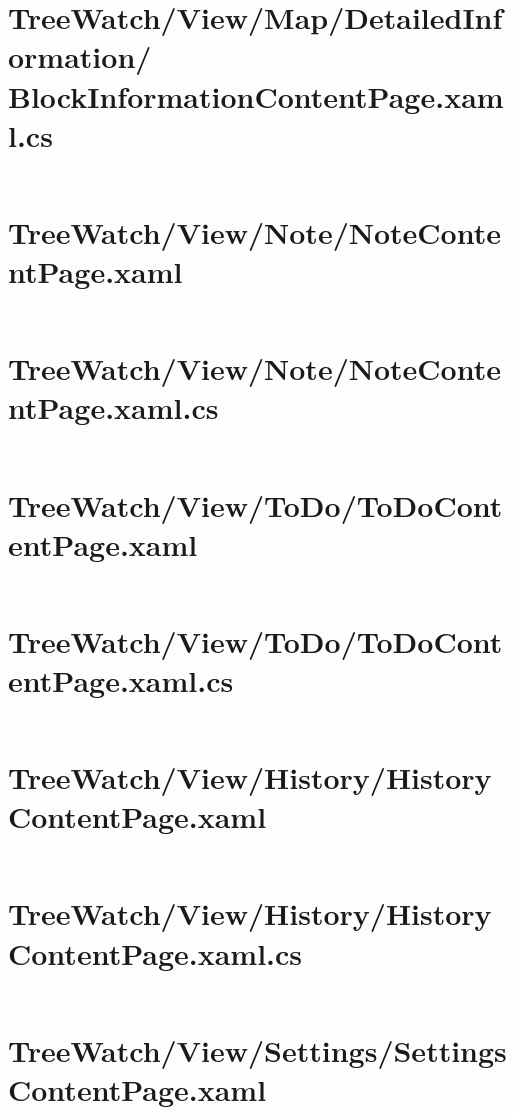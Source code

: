 \documentclass[12pt]{article}
\begin{document}
\pagebreak\section{TreeWatch/View/Map/DetailedInformation/ BlockInformationContentPage.xaml.cs}
\inputminted[linenos,firstline=22]{csharp}{../../../src/TreeWatch/View/Map/DetailedInformation/BlockInformationContentPage.xaml.cs}

\pagebreak\section{TreeWatch/View/Note/NoteContentPage.xaml}
\inputminted[linenos]{xml}{../../../src/TreeWatch/View/Note/NoteContentPage.xaml}

\pagebreak\section{TreeWatch/View/Note/NoteContentPage.xaml.cs}
\inputminted[linenos,firstline=22]{csharp}{../../../src/TreeWatch/View/Note/NoteContentPage.xaml.cs}

\pagebreak\section{TreeWatch/View/ToDo/ToDoContentPage.xaml}
\inputminted[linenos]{xml}{../../../src/TreeWatch/View/ToDo/ToDoContentPage.xaml}

\pagebreak\section{TreeWatch/View/ToDo/ToDoContentPage.xaml.cs}
\inputminted[linenos,firstline=22]{csharp}{../../../src/TreeWatch/View/ToDo/ToDoContentPage.xaml.cs}

\pagebreak\section{TreeWatch/View/History/HistoryContentPage.xaml}
\inputminted[linenos]{xml}{../../../src/TreeWatch/View/History/HistoryContentPage.xaml}

\pagebreak\section{TreeWatch/View/History/HistoryContentPage.xaml.cs}
\inputminted[linenos,firstline=22]{csharp}{../../../src/TreeWatch/View/History/HistoryContentPage.xaml.cs}

\pagebreak\section{TreeWatch/View/Settings/SettingsContentPage.xaml}
\inputminted[linenos]{xml}{../../../src/TreeWatch/View/Settings/SettingsContentPage.xaml}
\end{document}

